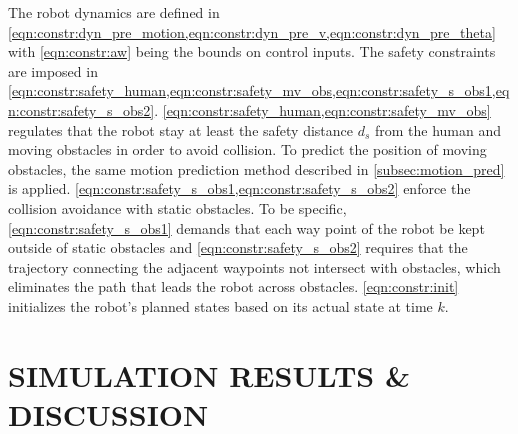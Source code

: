 \documentclass[letterpaper, 10 pt, conference]{ieeeconf}
\begin{document}
	The robot dynamics are defined in \cref{eqn:constr:dyn_pre_motion,eqn:constr:dyn_pre_v,eqn:constr:dyn_pre_theta} with \cref{eqn:constr:aw} being the bounds on control inputs.
	The safety constraints are imposed in \cref{eqn:constr:safety_human,eqn:constr:safety_mv_obs,eqn:constr:safety_s_obs1,eqn:constr:safety_s_obs2}.
	\cref{eqn:constr:safety_human,eqn:constr:safety_mv_obs} regulates that the robot stay at least the safety distance $d_s$ from the human and moving obstacles in order to avoid collision.
	To predict the position of moving obstacles, the same motion prediction method described in \cref{subsec:motion_pred} is applied.
	\cref{eqn:constr:safety_s_obs1,eqn:constr:safety_s_obs2} enforce the collision avoidance with static obstacles.
	To be specific, \cref{eqn:constr:safety_s_obs1} demands that each way point of the robot be kept outside of static obstacles and	\cref{eqn:constr:safety_s_obs2} requires that the trajectory connecting the adjacent waypoints not intersect with obstacles, which eliminates the path that leads the robot across obstacles.
	\cref{eqn:constr:init} initializes the robot's planned states based on its actual state at time $k$.
	
	
	\section{SIMULATION RESULTS \& DISCUSSION}\label{sec:results}
	
	
\end{document}
